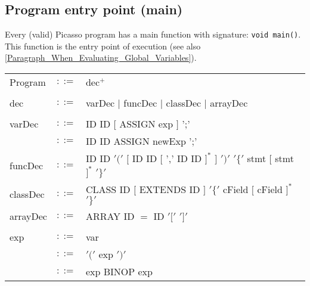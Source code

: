 \documentclass{article}
\begin{document}
\subsection{Program entry point (main)}
\label{subsection_Program_Entry_Point_Main}
Every (valid) Picasso program has a main function with signature: \verb"void main()".
This function is the entry point of execution (see also \ref{Paragraph_When_Evaluating_Global_Variables}).

\newpage
\begin{table}[h]
\centering
\begin{tabular}{ l c l }
Program  & $::=$ & dec$^{+}$ \\
\\
dec      & $::=$ & varDec $|$ funcDec $|$ classDec $|$ arrayDec \\
\\
varDec   & $::=$ & ID ID $[$ ASSIGN exp $]$ ';' \\
         & $::=$ & ID ID ASSIGN newExp ';'      \\
funcDec  & $::=$ & ID ID $'('$ $[$ ID ID $[$ ',' ID ID $]^{*}$ $]$ $')'$ %
                   $'\{'$ stmt   $[$ stmt $]^{*}$ $'\}'$                 \\
classDec & $::=$ & CLASS ID $[$ EXTENDS ID $]$ $'\{'$ cField $[$ cField $]^{*}$ $'\}'$ \\
arrayDec & $::=$ & ARRAY ID $=$ ID $'['$ $']'$ \\
\\
exp      & $::=$ & var                                                            \\
         & $::=$ & $'('$ exp $')'$                                                \\
         & $::=$ & exp BINOP exp                                                  \\

\end{tabular}
\end{table}
\end{document}
